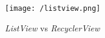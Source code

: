 \begin{figure}[!h]
	\begin{center}
		\texttt{[image: /listview.png]}
		\caption{\textit{ListView} vs \textit{RecyclerView}}
		\label{fig:listview}
	\end{center}
\end{figure}